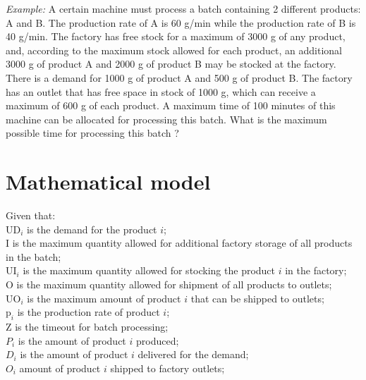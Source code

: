 \documentclass[preprint,12pt,authoryear]{elsarticle}
\begin{document}
\emph{Example:} A certain machine must process a batch containing 2 different products: A and B. The production rate of A is 60 g/min while the production rate of B is 40 g/min. The factory has free stock for a maximum of 3000 g of any product, and, according to the maximum stock allowed for each product, an additional 3000 g of product A and 2000 g of product B may be stocked at the factory. There is a demand for 1000 g of product A and 500 g of product B. The factory has an outlet that has free space in stock of 1000 g, which can receive a maximum of 600 g of each product. A maximum time of 100 minutes of this machine can be allocated for processing this batch. What is the maximum possible time for processing this batch ? 

\section{Mathematical model}
\label{sec:mathModel}

Given that: \\

$\textrm{UD}_i$ is the demand for the product $i$; \\

$\textrm{I}$ is the maximum quantity allowed for additional factory storage of all products in the batch; \\

$\textrm{UI}_i$ is the maximum quantity allowed for stocking the product $i$ in the factory; \\

$\textrm{O}$ is the maximum quantity allowed for shipment of all products to outlets; \\

$\textrm{UO}_i$ is the maximum amount of product $i$ that can be shipped to outlets; \\ 

$\textrm{p}_i$ is the production rate of product $i$; \\

$\textrm{Z}$ is the timeout for batch processing; \\

$P_i$ is the amount of product $i$ produced; \\

$D_i$ is the amount of product $i$ delivered for the demand; \\

$O_i$ amount of product $i$ shipped to factory outlets; \\
\end{document}
